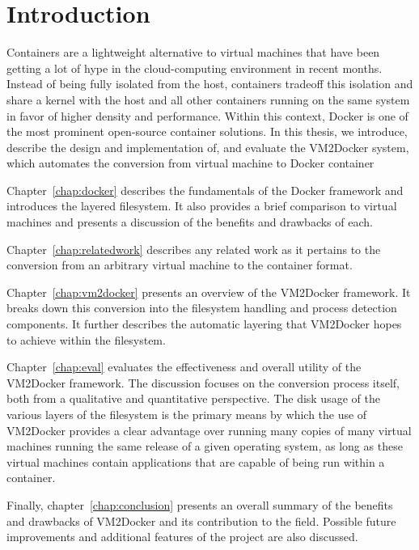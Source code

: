 \chapter{Introduction}

Containers are a lightweight alternative to virtual machines that have been getting a lot of hype in the cloud-computing environment in recent months. Instead of being fully isolated from the host, containers tradeoff this isolation and share a kernel with the host and all other containers running on the same system in favor of higher density and performance. Within this context, Docker is one of the most prominent open-source container solutions. In this thesis, we introduce, describe the design and implementation of, and evaluate the VM2Docker system, which automates the conversion from virtual machine to Docker container

Chapter~\ref{chap:docker} describes the fundamentals of the Docker framework and introduces the layered filesystem. It also provides a brief comparison to virtual machines and presents a discussion of the benefits and drawbacks of each.

Chapter~\ref{chap:relatedwork} describes any related work as it pertains to the conversion from an arbitrary virtual machine to the container format.

Chapter~\ref{chap:vm2docker} presents an overview of the VM2Docker framework. It breaks down this conversion into the filesystem handling and process detection components. It further describes the automatic layering that VM2Docker hopes to achieve within the filesystem.

Chapter~\ref{chap:eval} evaluates the effectiveness and overall utility of the VM2Docker framework. The discussion focuses on the conversion process itself, both from a qualitative and quantitative perspective. The disk usage of the various layers of the filesystem is the primary means by which the use of VM2Docker provides a clear advantage over running many copies of many virtual machines running the same release of a given operating system, as long as these virtual machines contain applications that are capable of being run within a container.

Finally, chapter~\ref{chap:conclusion} presents an overall summary of the benefits and drawbacks of VM2Docker and its contribution to the field. Possible future improvements and additional features of the project are also discussed.